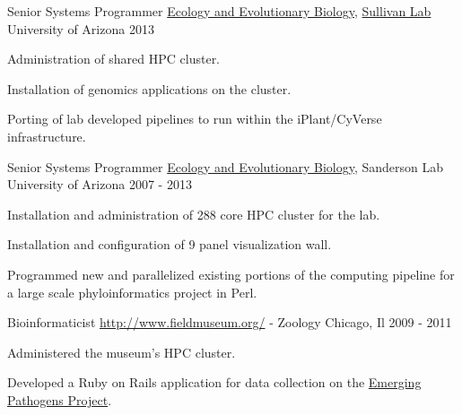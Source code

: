 \begin{cventries}
  \cventry
    {Senior Systems Programmer} %
    {\href{http://eeb.arizona.edu/}{Ecology and Evolutionary Biology}, \href{https://u.osu.edu/viruslab/}{Sullivan Lab}} %
    {University of Arizona} %
    {2013} %
    {
      \begin{cvitems} %
        \item {Administration of shared HPC cluster.}
        \item {Installation of genomics applications on the cluster.}
        \item {Porting of lab developed pipelines to run within the iPlant/CyVerse infrastructure.}
      \end{cvitems}
    }

  \cventry
    {Senior Systems Programmer} %
    {\href{http://eeb.arizona.edu/}{Ecology and Evolutionary Biology}, Sanderson Lab} %
    {University of Arizona} %
    {2007 - 2013} %
    {
      \begin{cvitems} %
        \item {Installation and administration of 288 core HPC cluster for the lab.}
        \item {Installation and configuration of 9 panel visualization wall.}
        \item {Programmed new and parallelized existing portions of the computing pipeline for a large scale phyloinformatics project in Perl.}
      \end{cvitems}
    }

  \cventry
    {Bioinformaticist} %
    {\href{The Field Museum}{http://www.fieldmuseum.org/} - Zoology} %
    {Chicago, Il} %
    {2009 - 2011} %
    {
      \begin{cvitems} %
        \item {Administered the museum's HPC cluster.}
        \item {Developed a Ruby on Rails application for data collection on the \href{https://www.fieldmuseum.org/emerging-pathogens-project}{Emerging Pathogens Project}.}
      \end{cvitems}
    }


\end{cventries}
